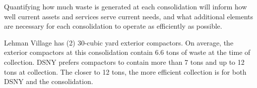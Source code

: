 
    Quantifying how much waste is generated at each consolidation will inform how well current assets and services serve current needs, and what additional elements are necessary for each consolidation to operate as efficiently as possible.
    
    Lehman Village has (2) 30-cubic yard exterior compactors. On average, the exterior compactors at this consolidation contain 6.6 tons of waste at the time of collection. DSNY prefers compactors to contain more than 7 tons and up to 12 tons at collection. The closer to 12 tons, the more efficient collection is for both DSNY and the consolidation.